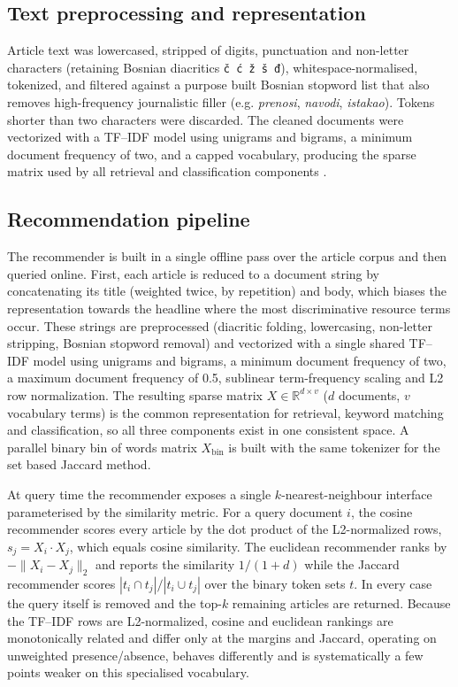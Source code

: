 \documentclass[fleqn,10pt]{wlscirep}
\begin{document}
\subsection*{Text preprocessing and representation}

Article text was lowercased, stripped of digits, punctuation and non-letter characters (retaining Bosnian diacritics \texttt{č ć ž š đ}), whitespace-normalised, tokenized, and filtered against a purpose built Bosnian stopword list that also removes high-frequency journalistic filler (e.g. \emph{prenosi}, \emph{navodi}, \emph{istakao}). Tokens shorter than two characters were discarded. The cleaned documents were vectorized with a TF--IDF model using unigrams and bigrams, a minimum document frequency of two, and a capped vocabulary, producing the sparse matrix used by all retrieval and classification components \cite{salton1988term,jones1972statistical}.

\subsection*{Recommendation pipeline}

The recommender is built in a single offline pass over the article corpus and then queried online. First, each article is reduced to a document string by concatenating its title (weighted twice, by repetition) and body, which biases the representation towards the headline where the most discriminative resource terms occur. These strings are preprocessed (diacritic folding, lowercasing, non-letter stripping, Bosnian stopword removal) and vectorized with a single shared TF--IDF model using unigrams and bigrams, a minimum document frequency of two, a maximum document frequency of 0.5, sublinear term-frequency scaling and L2 row normalization. The resulting sparse matrix $X \in \mathbb{R}^{d \times v}$ ($d$ documents, $v$ vocabulary terms) is the common representation for retrieval, keyword matching and classification, so all three components exist in one consistent space. A parallel binary bin of words matrix $X_{\mathrm{bin}}$ is built with the same tokenizer for the set based Jaccard method.

At query time the recommender exposes a single $k$-nearest-neighbour interface parameterised by the similarity metric. For a query document $i$, the cosine recommender scores every article by the dot product of the L2-normalized rows, $s_j = X_i \cdot X_j$, which equals cosine similarity. The euclidean recommender ranks by $-\lVert X_i - X_j \rVert_2$ and reports the similarity $1/(1+d)$ while the Jaccard recommender scores $|t_i \cap t_j| / |t_i \cup t_j|$ over the binary token sets $t$. In every case the query itself is removed and the top-$k$ remaining articles are returned. Because the TF--IDF rows are L2-normalized, cosine and euclidean rankings are monotonically related and differ only at the margins and Jaccard, operating on unweighted presence/absence, behaves differently and is systematically a few points weaker on this specialised vocabulary.
\end{document}
